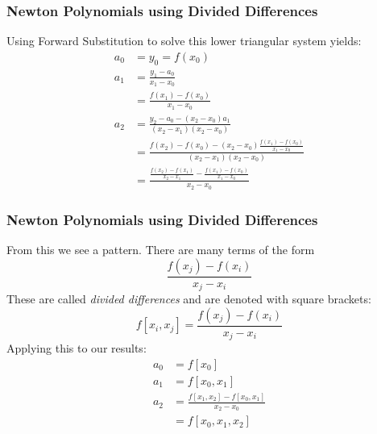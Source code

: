 \documentclass[10pt]{beamer}
\begin{document}
\begin{frame}
\frametitle{Newton Polynomials using Divided Differences}
Using Forward Substitution to solve this lower triangular system yields:
\begin{align*}
  a_0 & = y_0 = f(x_0)\\
  a_1 & = \frac{y_1 - a_0}{x_1 - x_0}\\
      & = \frac{f(x_1)-f(x_0)}{x_1 - x_0}\\
  a_2 & = \frac{y_2 - a_0 - (x_2-x_0)a_1}{(x_2-x_1)(x_2-x_0)}\\
      & = \frac{f(x_2)-f(x_0)-(x_2-x_0)\frac{f(x_1)-f(x_0)}{x_1-x_0}}{(x_2-x_1)(x_2-x_0)}\\
      & = \frac{\frac{f(x_2)-f(x_1)}{x_2-x_1} - \frac{f(x_1)-f(x_0)}{x_1-x_0} }{x_2-x_0}
\end{align*}
\end{frame}
\begin{frame}
\frametitle{Newton Polynomials using Divided Differences}
From this we see a pattern.   There are many terms of the form
\begin{equation*}
  \frac{f(x_j)-f(x_i)}{x_j-x_i}
\end{equation*}
These are called \emph{divided differences} and are denoted with square
brackets:
\begin{equation*}
  f[x_i,x_j] = \frac{f(x_j)-f(x_i)}{x_j-x_i}
\end{equation*}
Applying this to our results:
\begin{align*}
  a_0 & = f[x_0]\\
  a_1 & = f[x_0,x_1]\\
  a_2 & = \frac{f[x_1,x_2]-f[x_0,x_1]}{x_2-x_0}\\
      & = f[x_0,x_1,x_2]\\
\end{align*}
\end{frame}
\end{document}
